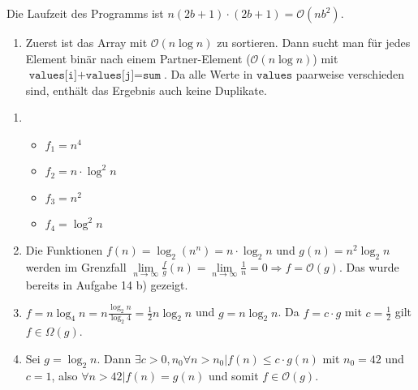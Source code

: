 \documentclass[a4paper,11pt]{article}             %
\begin{document}
Die Laufzeit des Programms ist $n(2b+1)\cdot(2b+1) = \mathcal{O}(nb^2)$.

\begin{enumerate}
\item Zuerst ist das Array mit $\mathcal O(n\log n)$ zu sortieren. Dann sucht man für jedes Element binär nach einem Partner-Element ($\mathcal O(n\log n)$) mit $\texttt{values[i]+values[j]} = \texttt{sum}$. Da alle Werte in $\texttt{values}$ paarweise verschieden sind, enthält das Ergebnis auch keine Duplikate.
\end{enumerate}

\begin{enumerate}
\item
\begin{itemize}
\item $f_1=n^4$
\item $f_2=n\cdot\log^2n$
\item $f_3=n^2$
\item $f_4=\log^2n$
\end{itemize}

\item Die Funktionen $f(n) = \log_2(n^n) = n\cdot\log_2 n$ und $g(n)=n^2\log_2 n$ werden im Grenzfall $\lim\limits_{n\to\infty}\frac{f}{g}(n)=\lim\limits_{n\to\infty}\frac{1}{n}=0\Rightarrow f=\mathcal O(g)$. Das wurde bereits in Aufgabe 14 b) gezeigt.

\item $f=n\log_4 n = n\frac{\log_2 n}{\log_2 4} = \frac{1}{2} n\log_2 n$ und $g=n\log_2 n$. Da $f=c\cdot g$ mit $c=\frac{1}{2}$ gilt $f\in\Omega(g)$.

\item Sei $g=\log_2 n$. Dann $\exists c>0,n_0 \forall n>n_0 | f(n) \leq c\cdot g(n)$ mit $n_0 = 42$ und $c=1$, also $\forall n>42|f(n) = g(n)$ und somit $f\in\mathcal O(g)$.
\end{enumerate}
\end{document}
